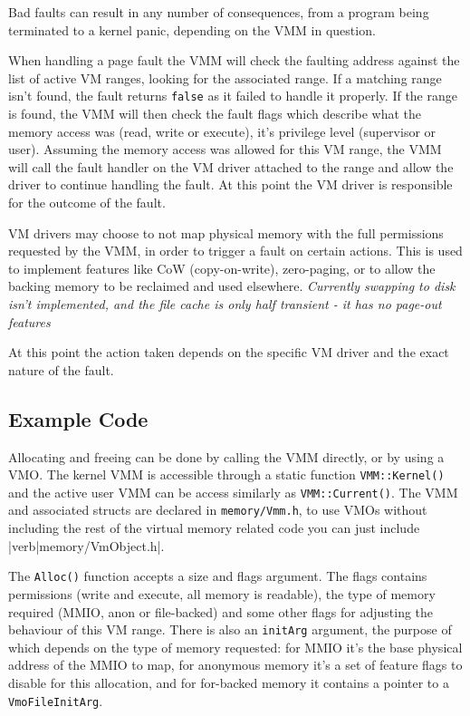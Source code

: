 Bad faults can result in any number of consequences, from a program being terminated to a kernel panic, depending on the VMM in question.

When handling a page fault the VMM will check the faulting address against the list of active VM ranges, looking for the associated range. If a matching range isn't found, the fault returns \verb|false| as it failed to handle it properly. If the range is found, the VMM will then check the fault flags which describe what the memory access was (read, write or execute), it's privilege level (supervisor or user). Assuming the memory access was allowed for this VM range, the VMM will call the fault handler on the VM driver attached to the range and allow the driver to continue handling the fault. At this point the VM driver is responsible for the outcome of the fault.

VM drivers may choose to not map physical memory with the full permissions requested by the VMM, in order to trigger a fault on certain actions. This is used to implement features like CoW (copy-on-write), zero-paging, or to allow the backing memory to be reclaimed and used elsewhere. \textit{Currently swapping to disk isn't implemented, and the file cache is only half transient - it has no page-out features}

At this point the action taken depends on the specific VM driver and the exact nature of the fault.

\subsection{Example Code}
Allocating and freeing can be done by calling the VMM directly, or by using a VMO. The kernel VMM is accessible through a static function \lstinline{VMM::Kernel()} and the active user VMM can be access similarly as \lstinline{VMM::Current()}. The VMM and associated structs are declared in \verb|memory/Vmm.h|, to use VMOs without including the rest of the virtual memory related code you can just include |verb|memory/VmObject.h|.

The \lstinline{Alloc()} function accepts a size and flags argument. The flags contains permissions (write and execute, all memory is readable), the type of memory required (MMIO, anon or file-backed) and some other flags for adjusting the behaviour of this VM range. There is also an \lstinline{initArg} argument, the purpose of which depends on the type of memory requested: for MMIO it's the base physical address of the MMIO to map, for anonymous memory it's a set of feature flags to disable for this allocation, and for for-backed memory it contains a pointer to a \lstinline{VmoFileInitArg}.


